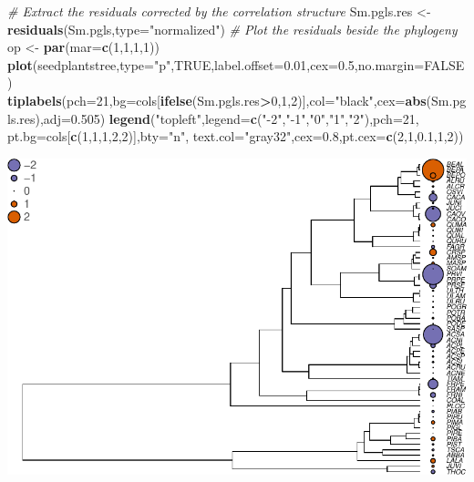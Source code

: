 \documentclass[
]{book}
\newenvironment{Shaded}{\begin{snugshade}}{\end{snugshade}}
\newcommand{\AttributeTok}[1]{\textcolor[rgb]{0.13,0.29,0.53}{#1}}
\newcommand{\CommentTok}[1]{\textcolor[rgb]{0.56,0.35,0.01}{\textit{#1}}}
\newcommand{\ConstantTok}[1]{\textcolor[rgb]{0.56,0.35,0.01}{#1}}
\newcommand{\DecValTok}[1]{\textcolor[rgb]{0.00,0.00,0.81}{#1}}
\newcommand{\FloatTok}[1]{\textcolor[rgb]{0.00,0.00,0.81}{#1}}
\newcommand{\FunctionTok}[1]{\textcolor[rgb]{0.13,0.29,0.53}{\textbf{#1}}}
\newcommand{\NormalTok}[1]{#1}
\newcommand{\OtherTok}[1]{\textcolor[rgb]{0.56,0.35,0.01}{#1}}
\newcommand{\SpecialCharTok}[1]{\textcolor[rgb]{0.81,0.36,0.00}{\textbf{#1}}}
\newcommand{\StringTok}[1]{\textcolor[rgb]{0.31,0.60,0.02}{#1}}
\begin{document}
\begin{Shaded}
\begin{Highlighting}[]
\CommentTok{\# Extract the residuals corrected by the correlation structure}
\NormalTok{Sm.pgls.res }\OtherTok{\textless{}{-}} \FunctionTok{residuals}\NormalTok{(Sm.pgls,}\AttributeTok{type=}\StringTok{"normalized"}\NormalTok{)}
\CommentTok{\# Plot the residuals beside the phylogeny}
\NormalTok{op }\OtherTok{\textless{}{-}} \FunctionTok{par}\NormalTok{(}\AttributeTok{mar=}\FunctionTok{c}\NormalTok{(}\DecValTok{1}\NormalTok{,}\DecValTok{1}\NormalTok{,}\DecValTok{1}\NormalTok{,}\DecValTok{1}\NormalTok{))}
\FunctionTok{plot}\NormalTok{(seedplantstree,}\AttributeTok{type=}\StringTok{"p"}\NormalTok{,}\ConstantTok{TRUE}\NormalTok{,}\AttributeTok{label.offset=}\FloatTok{0.01}\NormalTok{,}\AttributeTok{cex=}\FloatTok{0.5}\NormalTok{,}\AttributeTok{no.margin=}\ConstantTok{FALSE}\NormalTok{)}
\FunctionTok{tiplabels}\NormalTok{(}\AttributeTok{pch=}\DecValTok{21}\NormalTok{,}\AttributeTok{bg=}\NormalTok{cols[}\FunctionTok{ifelse}\NormalTok{(Sm.pgls.res}\SpecialCharTok{\textgreater{}}\DecValTok{0}\NormalTok{,}\DecValTok{1}\NormalTok{,}\DecValTok{2}\NormalTok{)],}\AttributeTok{col=}\StringTok{"black"}\NormalTok{,}\AttributeTok{cex=}\FunctionTok{abs}\NormalTok{(Sm.pgls.res),}\AttributeTok{adj=}\FloatTok{0.505}\NormalTok{)}
\FunctionTok{legend}\NormalTok{(}\StringTok{"topleft"}\NormalTok{,}\AttributeTok{legend=}\FunctionTok{c}\NormalTok{(}\StringTok{"{-}2"}\NormalTok{,}\StringTok{"{-}1"}\NormalTok{,}\StringTok{"0"}\NormalTok{,}\StringTok{"1"}\NormalTok{,}\StringTok{"2"}\NormalTok{),}\AttributeTok{pch=}\DecValTok{21}\NormalTok{,}
       \AttributeTok{pt.bg=}\NormalTok{cols[}\FunctionTok{c}\NormalTok{(}\DecValTok{1}\NormalTok{,}\DecValTok{1}\NormalTok{,}\DecValTok{1}\NormalTok{,}\DecValTok{2}\NormalTok{,}\DecValTok{2}\NormalTok{)],}\AttributeTok{bty=}\StringTok{"n"}\NormalTok{,}
       \AttributeTok{text.col=}\StringTok{"gray32"}\NormalTok{,}\AttributeTok{cex=}\FloatTok{0.8}\NormalTok{,}\AttributeTok{pt.cex=}\FunctionTok{c}\NormalTok{(}\DecValTok{2}\NormalTok{,}\DecValTok{1}\NormalTok{,}\FloatTok{0.1}\NormalTok{,}\DecValTok{1}\NormalTok{,}\DecValTok{2}\NormalTok{))}
\end{Highlighting}
\end{Shaded}

\includegraphics{pcm-workshop_files/figure-latex/Challenge 3 - solution-1.pdf}
\end{document}
